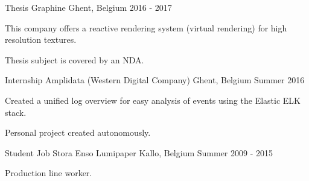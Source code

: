 


\begin{cventries}


\cventry
{Thesis} %
{Graphine} %
{Ghent, Belgium} %
{2016 - 2017} %
{ %
\begin{cvitems}
\item {This company offers a reactive rendering system (virtual rendering) for high resolution textures.}
\item {Thesis subject is covered by an NDA.}
\end{cvitems}
}


\cventry
{Internship} %
{Amplidata (Western Digital Company)} %
{Ghent, Belgium} %
{Summer 2016} %
{ %
\begin{cvitems}
\item {Created a unified log overview for easy analysis of events using the Elastic ELK stack.}
\item {Personal project created autonomously.}
\end{cvitems}
}


\cventry
{Student Job} %
{Stora Enso Lumipaper} %
{Kallo, Belgium} %
{Summer 2009 - 2015} %
{ %
\begin{cvitems}
\item {Production line worker.}
\end{cvitems}
}


\end{cventries}